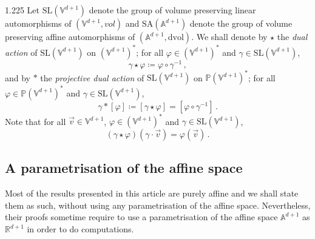 \documentclass[reqno, a4paper]{amsart}
\numberwithin{equation}{section}
\numberwithin{figure}{section}
\theoremstyle{definition}
\theoremstyle{remark}
\newcommand{\R}{\mathbb{R}} %
\newcommand{\V}{\mathbb{V}} %
\newcommand{\A}{\mathbb{A}} %
\renewcommand{\P}{\mathbb{P}} %
\newcommand{\SL}{\mathrm{SL}} %
\newcommand{\SA}{\mathrm{SA}} %
\newcommand{\dif}{\mathrm{d}} %
\newcommand{\linvol}{\mathit{vol}} %
\newcommand{\dvol}{\dif \mathrm{vol}} %
\begin{document}
\begin{spacing}{1.225}
Let $\SL(\V^{d+1})$ denote the group of volume preserving linear automorphisms of $(\V^{d+1}, \linvol)$ and $\SA(\A^{d+1})$ denote the group of volume preserving affine automorphisms of $(\A^{d+1}, \dvol)$. We shall denote by $\star$ the \emph{dual action} of $\SL(\V^{d+1})$ on $(\V^{d+1})^*$; for all $\varphi \in (\V^{d+1})^*$ and $\gamma \in \SL(\V^{d+1})$,
\begin{equation*}
\gamma \star \varphi \coloneqq \varphi \circ \gamma^{-1} \, ,
\end{equation*}
and by $*$ the \emph{projective dual action} of $\SL(\V^{d+1})$ on $\P(\V^{d+1})^*$; for all $\varphi \in \P(\V^{d+1})^*$ and $\gamma \in \SL(\V^{d+1})$,
\begin{equation*}
\gamma * [\varphi] \coloneqq [\gamma \star \varphi]= [\varphi \circ \gamma^{-1}] \, .
\end{equation*}
Note that for all $\vec{v} \in \V^{d+1}$, $\varphi \in (\V^{d+1})^*$ and $\gamma \in \SL(\V^{d+1})$,
\begin{equation}
\label{eq action and dual action}
(\gamma \star \varphi)(\gamma \cdot \vec{v})= \varphi(\vec{v}) \, .
\end{equation}


\subsection{A parametrisation of the affine space}

Most of the results presented in this article are purely affine and we shall state them as such, without using any parametrisation of the affine space. Nevertheless, their proofs sometime require to use a parametrisation of the affine space $\A^{d+1}$ as $\R^{d+1}$ in order to do computations. 


\end{spacing}
\end{document}

